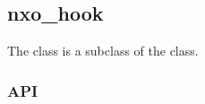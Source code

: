 %
%
%
%
%              

\subsection{nxo\_hook}
\label{nxo_hook}

The  class is a subclass of the  class.

\subsubsection{API}
